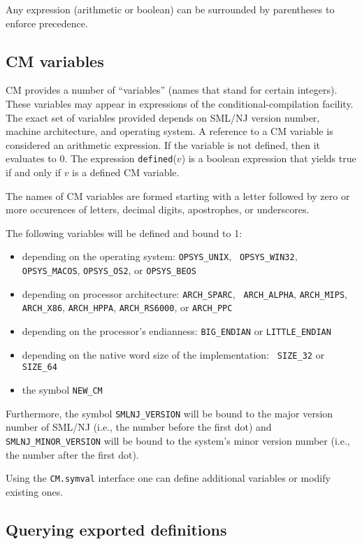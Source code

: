 \documentclass[titlepage,letterpaper]{article}
\begin{document}
Any expression (arithmetic or boolean) can be surrounded by
parentheses to enforce precedence.

\subsection{CM variables}
\label{sec:cmvars}

CM provides a number of ``variables'' (names that stand for certain
integers). These variables may appear in expressions of the
conditional-compilation facility. The exact set of variables provided
depends on SML/NJ version number, machine architecture, and
operating system.  A reference to a CM variable is considered an
arithmetic expression. If the variable is not defined, then it
evaluates to 0.  The expression {\tt defined}($v$) is a boolean
expression that yields true if and only if $v$ is a defined CM
variable.

The names of CM variables are formed starting with a letter followed
by zero or more occurences of letters, decimal digits, apostrophes, or
underscores.

The following variables will be defined and bound to 1:
\begin{itemize}
\item depending on the operating system: {\tt OPSYS\_UNIX}, {\tt
OPSYS\_WIN32}, {\tt OPSYS\_MACOS}, {\tt OPSYS\_OS2}, or \linebreak
{\tt OPSYS\_BEOS}
\item depending on processor architecture: {\tt ARCH\_SPARC}, {\tt
ARCH\_ALPHA}, {\tt ARCH\_MIPS}, {\tt ARCH\_X86}, {\tt ARCH\_HPPA},
{\tt ARCH\_RS6000}, or {\tt ARCH\_PPC}
\item depending on the processor's endianness: {\tt BIG\_ENDIAN} or
{\tt LITTLE\_ENDIAN}
\item depending on the native word size of the implementation: {\tt
SIZE\_32} or {\tt SIZE\_64}
\item the symbol {\tt NEW\_CM}
\end{itemize}

Furthermore, the symbol {\tt SMLNJ\_VERSION} will be bound to the
major version number of SML/NJ (i.e., the number before the first dot)
and {\tt SMLNJ\_MINOR\_VERSION} will be bound to the system's minor
version number (i.e., the number after the first dot).

Using the {\tt CM.symval} interface one can define additional
variables or modify existing ones.

\subsection{Querying exported definitions}
\end{document}
